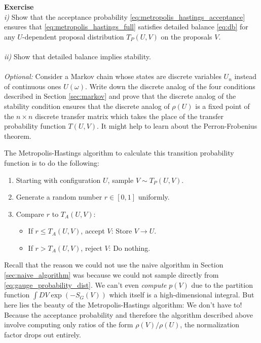 \documentclass[11pt]{article}
\newcounter{exerciseno}
\DeclareRobustCommand{\exCnt}{\refstepcounter{exerciseno}\theexerciseno}
\begin{document}
\pagebreak %

\begin{tcolorbox}\textbf{Exercise \exCnt}\\
\emph{i)} Show that the acceptance probability \eqref{eq:metropolis_hastings_acceptance} ensures that \eqref{eq:metropolis_hastings_full} satisfies detailed balance \eqref{eq:db} for any $U$-dependent proposal distribution $T_P(U,V)$ on the proposals $V$. \\\\
\emph{ii)} Show that detailed balance implies stability. \\\\
\emph{Optional:} Consider a Markov chain whose states are discrete variables $U_n$ instead of continuous ones $U(\omega)$. Write down the discrete analog of the four conditions described in Section \ref{sec:markov} and prove that the discrete analog of the stability condition ensures that the discrete analog of $\rho (U)$ is a fixed point of the $n\times n$ discrete transfer matrix which takes the place of the transfer probability function $T(U,V)$. It might help to learn about the Perron-Frobenius theorem. 
\end{tcolorbox}

The Metropolis-Hastings algorithm to calculate this transition probability function is to do the following:

\begin{enumerate}
\item Starting with configuration $U$, sample $V\sim T_P(U,V)$.
\item Generate a random number $r\in [0,1]$ uniformly.
\item Compare $r$ to $T_A(U,V)$:
	\begin{itemize}
	\item If $r\leq T_A(U,V)$, accept $V$: Store $V\to U$.
	\item If $r>T_A(U,V)$, reject $V$: Do nothing.
	\end{itemize}
\end{enumerate}

Recall that the reason we could not use the naive algorithm in Section \ref{sec:naive_algorithm} was because we could not sample directly from \eqref{eq:gauge_probability_dist}. We can't even \textit{compute} $p(V)$ due to the partition function $\int DV\exp(-S_G(V))$ which itself is a high-dimensional integral. But here lies the beauty of the Metropolis-Hastings algorithm: We don't have to! Because the acceptance probability and therefore the algorithm described above involve computing only ratios of the form $\rho(V)/\rho(U)$, the normalization factor drops out entirely.
\end{document}
